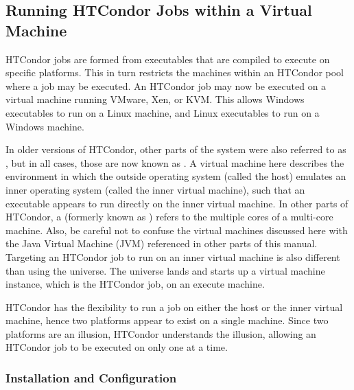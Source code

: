 \subsection{\label{sec:Virtual-Machines}
Running HTCondor Jobs within a Virtual Machine}

HTCondor jobs are formed from executables that are compiled to execute
on specific platforms.
This in turn restricts the machines within an HTCondor pool where
a job may be executed.
An HTCondor job may now be executed on a 
virtual machine running VMware, Xen, or KVM.
This allows Windows executables to run on a Linux machine,
and Linux executables to run on a Windows machine.

In older versions of HTCondor, other parts of the system were also
referred to as , but in all cases, those are now
known as .
A virtual machine here describes the environment in which
the outside operating system (called the host) emulates an inner operating
system (called the inner virtual machine),
such that an executable appears to run directly
on the inner virtual machine.
In other parts of HTCondor, a  (formerly known as
) refers to the multiple cores of a multi-core
machine.
Also, be careful not to confuse the virtual machines discussed here
with the Java Virtual Machine (JVM) referenced in other parts of this
manual.
Targeting an HTCondor job to run on an inner virtual machine is
also different than using the  universe. 
The  universe lands and starts up a virtual machine
instance, which is the HTCondor job, on an execute machine.

HTCondor has the flexibility to run a job on either the host
or the inner virtual machine, 
hence two platforms appear to exist on a single machine.
Since two platforms are an illusion, HTCondor understands the illusion, 
allowing an HTCondor job to be executed on only
one at a time.

\subsubsection{\label{sec:Virtual-Machines-Configuration}
Installation and Configuration}

